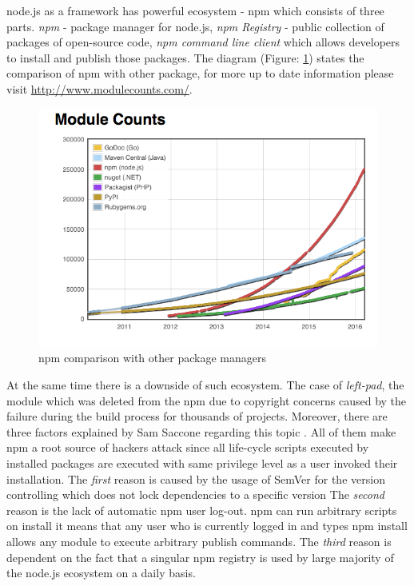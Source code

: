 node.js as a framework has powerful ecosystem - npm which consists of three parts. \textit{npm} - package manager for node.js, \textit{npm Registry} - public collection of packages of open-source code, \textit{npm command line client} which allows developers to install and publish those packages. The diagram (Figure: \ref{fig:npmStat}) states the comparison of npm with other package, for more up to date information please visit \url{http://www.modulecounts.com/}.
\begin{figure}[ht]
	\label{fig:npmStat}
	\centering
	\includegraphics[width=\textwidth]{grafiken/modulecounts.png}
	\caption{npm comparison with other package managers\cite{moduleCounts}}
\end{figure}

At the same time there is a downside of such ecosystem. The case of \textit{left-pad}, the module which was deleted from the npm due to copyright concerns caused by the failure during the build process for thousands of projects\cite{npmDown}. Moreover, there are three factors explained by Sam Saccone regarding this topic \cite{npmHydra} \cite{npmSoft}. All of them make npm a root source of hackers attack since all life-cycle scripts executed by installed packages are executed with same privilege level as a user invoked their installation. The \textit{first} reason is caused by the usage of SemVer for the version controlling which does not lock dependencies to a specific version The\textit{ second }reason is the lack of automatic npm user log-out.  npm can run arbitrary scripts on install it means that any user who is currently logged in and types npm install allows any module to execute arbitrary publish commands. The \textit{third} reason is dependent on the fact that a singular npm registry is used by large majority of the node.js ecosystem on a daily basis.

